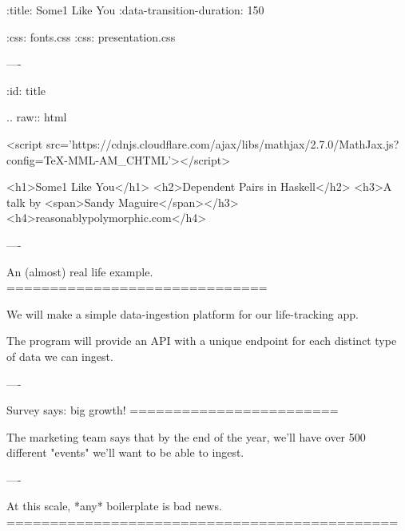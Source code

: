 :title: Some1 Like You
:data-transition-duration: 150

:css: fonts.css
:css: presentation.css


\newenvironment{table}{.. raw:: html

  <table>}{
  </table>
}

\newenvironment{hs}{.. code:: haskell
}{}
\newenvironment{raw}{.. raw:: html

  <pre>}{
  </pre>
}
\newenvironment{error}{.. raw:: html

  <pre class="error">}{    </pre>
}
\newenvironment{custom}{.. raw:: html

  <pre class="highlight code haskell">}{
  </pre>
}
\newcommand{\$}{\begin{verbatim}$\end{verbatim}}
\newcommand{\todo}[2]{#2}
\newcommand{\note}[1]{<span class="new">#1</span>}
\newcommand{\wat}[1]{<span class="wat">#1</span>}
\newcommand{\type}[1]{<span class="type">#1</span>}
\newcommand{\kind}[1]{<span class="kind">#1</span>}
\newcommand{\syn}[2]{<span class="#1">#2</span>}
\newcommand{\pragma}[1]{\{-# LANGUAGE #1 #-\}}
\newcommand{\pragmasyn}[1]{\syn{cm}{\{-# LANGUAGE #1 #-\}}}
\newcommand{\b}[1]{<pre class="highlight haskell code">#1</pre>}

----

:id: title

.. raw:: html

  <script src='https://cdnjs.cloudflare.com/ajax/libs/mathjax/2.7.0/MathJax.js?config=TeX-MML-AM_CHTML'></script>

  <h1>Some1 Like You</h1>
  <h2>Dependent Pairs in Haskell</h2>
  <h3>A talk by <span>Sandy Maguire</span></h3>
  <h4>reasonablypolymorphic.com</h4>

----

An (almost) real life example.
==============================

We will make a simple data-ingestion platform for our life-tracking app.

The program will provide an API with a unique endpoint for each distinct type of data we can ingest.

----

Survey says: big growth!
========================

The marketing team says that by the end of the year, we'll have over 500 different "events" we'll want to be able to
ingest.

----

At this scale, *any* boilerplate is bad news.
=============================================

